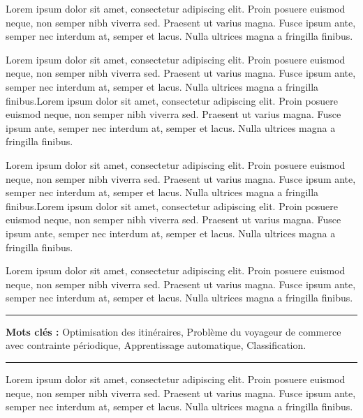 
Lorem ipsum dolor sit amet, consectetur adipiscing elit. Proin posuere euismod neque, non semper nibh viverra sed. Praesent ut varius magna. Fusce ipsum ante, semper nec interdum at, semper et lacus. Nulla ultrices magna a fringilla finibus.

\medskip

Lorem ipsum dolor sit amet, consectetur adipiscing elit. Proin posuere euismod neque, non semper nibh viverra sed. Praesent ut varius magna. Fusce ipsum ante, semper nec interdum at, semper et lacus. Nulla ultrices magna a fringilla finibus.Lorem ipsum dolor sit amet, consectetur adipiscing elit. Proin posuere euismod neque, non semper nibh viverra sed. Praesent ut varius magna. Fusce ipsum ante, semper nec interdum at, semper et lacus. Nulla ultrices magna a fringilla finibus.

\medskip

Lorem ipsum dolor sit amet, consectetur adipiscing elit. Proin posuere euismod neque, non semper nibh viverra sed. Praesent ut varius magna. Fusce ipsum ante, semper nec interdum at, semper et lacus. Nulla ultrices magna a fringilla finibus.Lorem ipsum dolor sit amet, consectetur adipiscing elit. Proin posuere euismod neque, non semper nibh viverra sed. Praesent ut varius magna. Fusce ipsum ante, semper nec interdum at, semper et lacus. Nulla ultrices magna a fringilla finibus.

\medskip

Lorem ipsum dolor sit amet, consectetur adipiscing elit. Proin posuere euismod neque, non semper nibh viverra sed. Praesent ut varius magna. Fusce ipsum ante, semper nec interdum at, semper et lacus. Nulla ultrices magna a fringilla finibus.

\vspace{1cm}


\noindent\rule[2pt]{\textwidth}{0.5pt}

{\textbf{Mots clés :}}
Optimisation des itinéraires, Problème du voyageur de commerce avec contrainte périodique, Apprentissage automatique, Classification.
\\
\noindent\rule[2pt]{\textwidth}{0.5pt}

\clearpage


Lorem ipsum dolor sit amet, consectetur adipiscing elit. Proin posuere euismod neque, non semper nibh viverra sed. Praesent ut varius magna. Fusce ipsum ante, semper nec interdum at, semper et lacus. Nulla ultrices magna a fringilla finibus.

